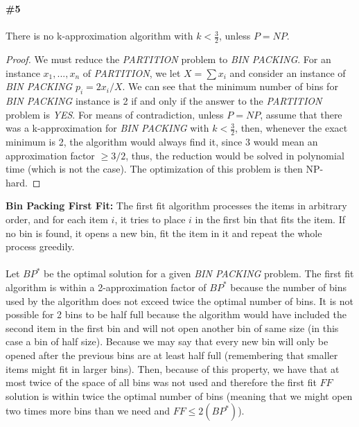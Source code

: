 \documentclass{article}
\begin{document}
\newpage
\textbf{\#5}
\\
\\
There is no k-approximation algorithm with $k < \frac{3}{2}$, unless $P = NP$.
\begin{proof}
We must reduce the \textit{PARTITION} problem to \textit{BIN PACKING}. For an instance $x_1, ..., x_n$ of \textit{PARTITION}, we let $X = \sum x_i$ and consider an instance of \textit{BIN PACKING} $p_i = 2x_i/X$. We can see that the minimum number of bins for \textit{BIN PACKING} instance is 2 if and only if the answer to the \textit{PARTITION} problem is \textit{YES}. For means of contradiction, unless $P = NP$, assume that there was a k-approximation for \textit{BIN PACKING} with $k < \frac{3}{2}$, then, whenever the exact minimum is 2, the algorithm would always find it, since $3$ would mean an approximation factor $\geq 3/2$, thus, the reduction would be solved in polynomial time (which is not the case). The optimization of this problem is then NP-hard.
\end{proof}
\textbf{Bin Packing First Fit:} The first fit algorithm processes the items in arbitrary order, and for each item $i$, it tries to place $i$ in the first bin that fits the item. If no bin is found, it opens a new bin, fit the item in it and repeat the whole process greedily.
\\
\\
Let $BP^*$ be the optimal solution for a given \textit{BIN PACKING} problem. The first fit algorithm is within a 2-approximation factor of $BP^*$ because the number of bins used by the algorithm does not exceed twice the optimal number of bins. It is not possible for 2 bins to be half full because the algorithm would have included the second item in the first bin and will not open another bin of same size (in this case a bin of half size). Because we may say that every new bin will only be opened after the previous bins are at least half full (remembering that smaller items might fit in larger bins). Then, because of this property, we have that at most twice of the space of all bins was not used and therefore the first fit $FF$ solution is within twice the optimal number of bins (meaning that we might open two times more bins than we need and $FF \leq 2(BP^*)$).
\end{document}
